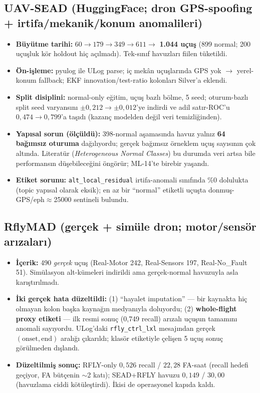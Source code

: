 \documentclass[11pt,a4paper]{article}
\newcommand{\code}[1]{\texttt{\small #1}}
\begin{document}
\subsection{UAV-SEAD (HuggingFace; dron GPS-spoofing + irtifa/mekanik/konum anomalileri)}
\begin{itemize}[leftmargin=1.2em,itemsep=1pt]
  \item \textbf{Büyütme tarihi:} $60 \to 179 \to 349 \to 611 \to$ \textbf{1.044 uçuş}
  (899 normal; 200 uçuşluk kör holdout hiç açılmadı). Tek-sınıf havuzları fiilen
  tüketildi.
  \item \textbf{Ön-işleme:} pyulog ile ULog parse; iç mekân uçuşlarında GPS yok
  $\to$ yerel-konum fallback; EKF innovation/test-ratio kolonları Silver'a eklendi.
  \item \textbf{Split disiplini:} normal-only eğitim, uçuş bazlı bölme, 5 seed;
  oturum-bazlı split seed varyansını $\pm0{,}212 \to \pm0{,}012$'ye indirdi ve adil
  satır-ROC'u $0{,}474 \to 0{,}799$'a taşıdı (kazanç modelden değil veri
  temizliğinden).
  \item \textbf{Yapısal sorun (ölçüldü):} 398-normal aşamasında havuz yalnız
  \textbf{64 bağımsız oturuma} dağılıyordu; gerçek bağımsız örneklem uçuş sayısının
  çok altında. Literatür (\emph{Heterogeneous Normal Classes}) bu durumda veri
  artsa bile performansın düşebileceğini öngörür; ML-14'te birebir yaşandı.
  \item \textbf{Etiket sorunu:} \code{alt\_local\_residual} irtifa-anomali sınıfında
  \%0 dolulukta (topic yapısal olarak eksik); en az bir ``normal'' etiketli uçuşta
  donmuş-GPS/eph$\approx$25000 sentineli bulundu.
\end{itemize}

\subsection{RflyMAD (gerçek + simüle dron; motor/sensör arızaları)}
\begin{itemize}[leftmargin=1.2em,itemsep=1pt]
  \item \textbf{İçerik:} 490 \emph{gerçek} uçuş (Real-Motor 242, Real-Sensors 197,
  Real-No\_Fault 51). Simülasyon alt-kümeleri indirildi ama gerçek-normal havuzuyla
  asla karıştırılmadı.
  \item \textbf{İki gerçek hata düzeltildi:} (1) ``hayalet imputation'' --- bir
  kaynakta hiç olmayan kolon başka kaynağın medyanıyla doluyordu; (2)
  \textbf{whole-flight proxy etiketi} --- ilk resmi sonuç (0{,}749 recall) arızalı
  uçuşun tamamını anomali sayıyordu. ULog'daki \code{rfly\_ctrl\_lxl} mesajından
  gerçek $(\mathrm{onset}, \mathrm{end})$ aralığı çıkarıldı; klasör etiketiyle
  çelişen 5 uçuş sonuç görülmeden dışlandı.
  \item \textbf{Düzeltilmiş sonuç:} RFLY-only $0{,}526$ recall / $22{,}28$ FA-saat
  (recall hedefi geçiyor, FA bütçenin $\sim$2 katı); SEAD+RFLY havuzu
  $0{,}149$ / $30{,}00$ (havuzlama ciddi kötüleştirdi). İkisi de operasyonel kapıda
  kaldı.
\end{itemize}
\end{document}
